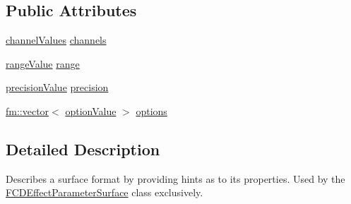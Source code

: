 \subsection*{Public Attributes}
\begin{DoxyCompactItemize}
\item 
\hyperlink{structFCDFormatHint_a4c22503ef75be12aa19a582b88ce32c1}{channelValues} \hyperlink{structFCDFormatHint_acfb2c3d8e09bcb65430d2d733ee2023c}{channels}
\item 
\hyperlink{structFCDFormatHint_a28f1ee9691301b71d657b472689d77a9}{rangeValue} \hyperlink{structFCDFormatHint_ab999301788a29244f9b81e9dd6fe4277}{range}
\item 
\hyperlink{structFCDFormatHint_a720a2fffc66e38ba997c263e22ddc2c2}{precisionValue} \hyperlink{structFCDFormatHint_ab9648a25aadd4c375d3b574f3c980d74}{precision}
\item 
\hyperlink{classfm_1_1vector}{fm::vector}$<$ \hyperlink{structFCDFormatHint_a4777b8826090e9f6c9812711faf3ac66}{optionValue} $>$ \hyperlink{structFCDFormatHint_aaa86d7af04b996fb90c551b2d401a0be}{options}
\end{DoxyCompactItemize}


\subsection{Detailed Description}
Describes a surface format by providing hints as to its properties. Used by the \hyperlink{classFCDEffectParameterSurface}{FCDEffectParameterSurface} class exclusively. 

